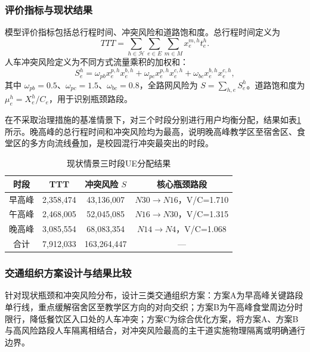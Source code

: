 \documentclass[UTF8,zihao=-4,a4paper]{ctexart}
\begin{document}
\subsubsection{评价指标与现状结果}

模型评价指标包括总行程时间、冲突风险和道路饱和度。总行程时间定义为
\begin{equation}
TTT=\sum_{h\in\mathcal{H}}\sum_{e\in E}\sum_{m\in M}x_e^{m,h}t_e^h.
\end{equation}
人车冲突风险定义为不同方式流量乘积的加权和：
\begin{equation}
S_e^h=\omega_{pb}x_e^{p,h}x_e^{b,h}+\omega_{pc}x_e^{p,h}x_e^{c,h}+\omega_{bc}x_e^{b,h}x_e^{c,h},
\end{equation}
其中 $\omega_{pb}=0.5$、$\omega_{pc}=1.5$、$\omega_{bc}=0.8$，全路网风险为 $S=\sum_{h,e}S_e^h$。道路饱和度为 $\mu_e^h=X_e^h/C_e$，用于识别瓶颈路段。

在不采取治理措施的基准情景下，对三个时段分别进行用户均衡分配，结果如表\ref{tab:baseline}所示。晚高峰的总行程时间和冲突风险均为最高，说明晚高峰教学区至宿舍区、食堂区的多方向流线叠加，是校园混行冲突最突出的时段。

\begin{table}[H]
\centering
\caption{现状情景三时段UE分配结果}
\label{tab:baseline}
\begin{tabular}{cccc}
\toprule
\textbf{时段} & \textbf{TTT} & \textbf{冲突风险 $S$} & \textbf{核心瓶颈路段} \\
\midrule
早高峰 & 2,358,474 & 43,136,007 & $N30\rightarrow N16$，V/C=1.710 \\
午高峰 & 2,468,005 & 52,045,085 & $N16\rightarrow N30$，V/C=1.315 \\
晚高峰 & 3,085,554 & 68,083,354 & $N14\rightarrow N4$，V/C=1.068 \\
\midrule
合计 & 7,912,033 & 163,264,447 & --- \\
\bottomrule
\end{tabular}
\end{table}

\subsubsection{交通组织方案设计与结果比较}

针对现状瓶颈和冲突风险分布，设计三类交通组织方案：方案A为早高峰关键路段单行线，重点缓解宿舍区至教学区方向的对向交织；方案B为午高峰食堂周边分时限行，降低餐饮区入口处的人车冲突；方案C为综合优化方案，将方案A、方案B与高风险路段人车隔离相结合，对冲突风险最高的主干道实施物理隔离或明确通行边界。
\end{document}
